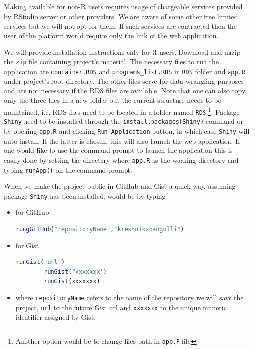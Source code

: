 \documentclass{article}
\begin{document}
Making available for non-R users requires usage of chargeable services provided by RStudio server or other providers. We are aware of some other free limited services but we will not opt for them. If such services are contracted then the user of the platform would require only the link of the web application. 

We will provide installation instructions only for R users. Download and unzip the \texttt{zip} file containing project's material. The necessary files to run the application are \texttt{container.RDS} and \texttt{programs\_list.RDS} in \texttt{RDS} folder and \texttt{app.R} under project's root directory. The other files serve for data wrangling purposes and are not necessary if the RDS files are available. Note that one can also copy only the three files in a new folder but the current structure needs to be maintained, i.e. RDS files need to be located in a folder named \texttt{RDS} \footnote{Another option would be to change files path in \texttt{app.R} file}. Package \texttt{Shiny} need to be installed through the \texttt{install.packages(Shiny)} command or by opening \texttt{app.R} and clicking \texttt{Run Application} button, in which case \texttt{Shiny} will auto install. If the latter is chosen, this will also launch the web application. If one would like to use the command prompt to launch the application this is easily done by setting the directory where \texttt{app.R} as the working directory and typing \texttt{runApp()} on the command prompt.

When we make the project public in GitHub and Gist a quick way, assuming package \texttt{Shiny} has been installed, would be by typing
	\begin{itemize}
		\item for GitHub
		 \begin{lstlisting}[language=R]
		rungGitHub("repositoryName","kreshnikxhangolli")
		\end{lstlisting}
		\item for Gist
		 \begin{lstlisting}[language=R]
		runGist("url")
		runGist("xxxxxxx")
		runGist(xxxxxxx)
		\end{lstlisting}
		\item where \texttt{repositoryName} refers to the name of the repository we will save the project, \texttt{url} to the future Gist url and \texttt{xxxxxxx} to the unique numeric identifier assigned by Gist. 
	\end{itemize}



	
\end{document}
